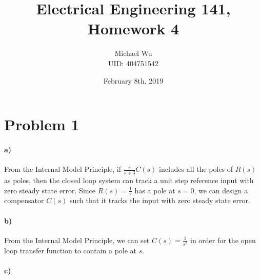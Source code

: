 \documentclass[12pt]{article}
\begin{document}
\title{Electrical Engineering 141, Homework 4}
\date{February 8th, 2019}
\author{Michael Wu\\UID: 404751542}
\maketitle

\section*{Problem 1}

\paragraph{a)}

From the Internal Model Principle, if \(\frac{s}{s+3}C(s)\) includes all the poles of \(R(s)\) as poles,
then the closed loop system can track a unit step reference input with zero steady state error. Since
\(R(s)=\frac{1}{s}\) has a pole at \(s=0\), we can design a compensator \(C(s)\) such that it tracks
the input with zero steady state error.

\paragraph{b)}

From the Internal Model Principle, we can set \(C(s)=\frac{1}{s^2}\) in order for the open loop transfer
function to contain a pole at \(s\).

\paragraph{c)}
\end{document}
